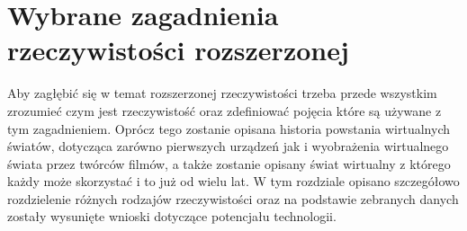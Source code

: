 \chapter{Wybrane zagadnienia rzeczywistości rozszerzonej}
\label{ch:zagadnienia}
Aby zagłębić się w temat rozszerzonej rzeczywistości trzeba przede wszystkim zrozumieć czym jest rzeczywistość oraz zdefiniować pojęcia które są używane z tym zagadnieniem. Oprócz tego zostanie opisana historia powstania wirtualnych światów, dotycząca zarówno pierwszych urządzeń jak i wyobrażenia wirtualnego świata przez twórców filmów, a także zostanie opisany świat wirtualny z którego każdy może skorzystać i to już od wielu lat. W tym rozdziale opisano szczegółowo rozdzielenie różnych rodzajów rzeczywistości oraz na podstawie zebranych danych zostały wysunięte wnioski dotyczące potencjału technologii.

